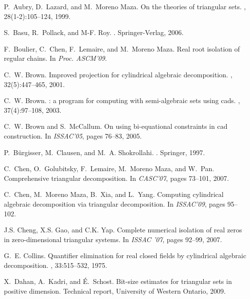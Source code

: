 \documentclass{sig-alternate}
\begin{document}
\small
\begin{thebibliography}{10}
\vspace{0.5em}
P.~Aubry, D.~Lazard, and M.~{{Moreno Maza}}.
\newblock On the theories of triangular sets.
, 28(1-2):105--124, 1999.

S.~Basu, R.~Pollack, and M-F. Roy.
.
\newblock Springer-Verlag, 2006.

F.~Boulier, C.~Chen, F.~Lemaire, and M.~{Moreno Maza}.
\newblock Real root isolation of regular chains.
\newblock In {\em Proc. {ASCM'09}}.

C.~W. Brown.
\newblock Improved projection for cylindrical algebraic decomposition.
, 32(5):447--465, 2001.

C.~W. Brown.
: a program for computing with semi-algebraic sets
  using cads.
, 37(4):97--108, 2003.

C.~W. Brown and S.~McCallum.
\newblock On using bi-equational constraints in cad construction.
\newblock In {\em ISSAC'05}, pages 76--83, 2005.

P.~B\"{u}rgisser, M.~Clausen, and M.~A. Shokrollahi.
.
\newblock Springer, 1997.





C.~Chen, O.~Golubitsky, F.~Lemaire, M.~{Moreno Maza}, and W.~Pan.
\newblock Comprehensive triangular decomposition.
\newblock In {\em {CASC'07}}, pages 73--101, 2007.

C.~Chen, M.~{Moreno Maza}, B.~{Xia}, and L.~Yang.
\newblock Computing cylindrical algebraic decomposition via triangular
  decomposition.
\newblock In {\em ISSAC'09}, pages 95--102.

J.S. Cheng, X.S. Gao, and C.K. Yap.
\newblock Complete numerical isolation of real zeros in zero-dimensional
  triangular systems.
\newblock In {\em ISSAC '07}, pages 92--99, 2007.

G.~E. Collins.
\newblock Quantifier elimination for real closed fields by cylindrical
  algebraic decomposition.
, 33:515--532, 1975.

X.~Dahan, A.~Kadri, and {\'E}.~Schost.
\newblock Bit-size estimates for triangular sets in positive dimension.
\newblock Technical report, University of Western Ontario, 2009.


\end{thebibliography}
\end{document}

